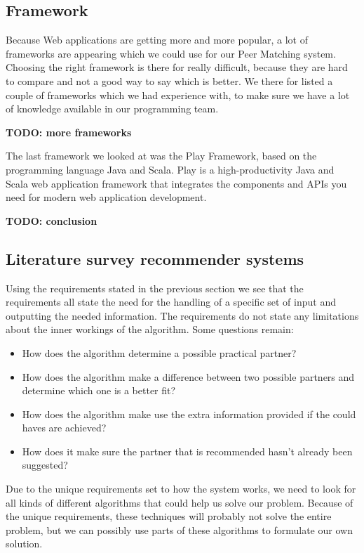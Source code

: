 \documentclass[]{article}
\newcommand{\TODO}[1]{{\color{red}\textbf{TODO: #1}}}
\begin{document}
\subsection{Framework}
Because Web applications are getting more and more popular, a lot of frameworks are appearing which we could use for our Peer Matching system.
Choosing the right framework is there for really difficult, because they are hard to compare and not a good way to say which is better.
We there for listed a couple of frameworks which we had experience with, to make sure we have a lot of knowledge available in our programming team.

\TODO{more frameworks}

The last framework we looked at was the Play Framework\cite{play}, based on the programming language Java and Scala.
Play is a high-productivity Java and Scala web application framework that integrates the components and APIs you need for modern web application development.

\TODO{conclusion}

\subsection{Literature survey recommender systems}
Using the requirements stated in the previous section we see that the requirements all state the need for the handling of a specific set of input and outputting the needed information.
The requirements do not state any limitations about the inner workings of the algorithm.
Some questions remain:
\begin{itemize}
\item How does the algorithm determine a possible practical partner?
\item How does the algorithm make a difference between two possible partners and determine which one is a better fit?
\item How does the algorithm make use the extra information provided if the could haves are achieved?
\item How does it make sure the partner that is recommended hasn't already been suggested?
\end{itemize}
Due to the unique requirements set to how the system works, we need to look for all kinds of different algorithms that could help us solve our problem.
Because of the unique requirements, these techniques will probably not solve the entire problem, but we can possibly use parts of these algorithms to formulate our own solution.
\end{document}
